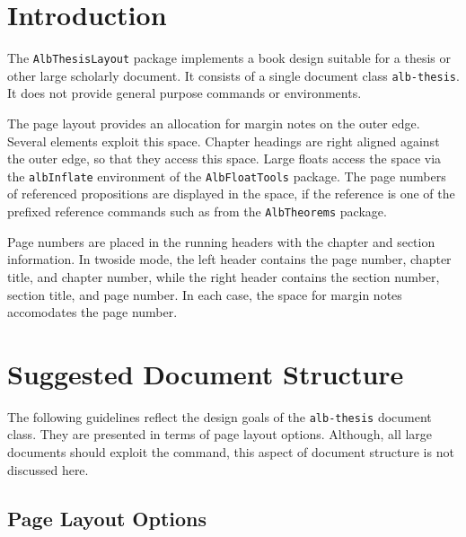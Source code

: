 \documentclass[11pt,a4paper,oneside,titlepage]{alb-corp}
\begin{document}

\section{Introduction}
\label{sec:alb-thesis-layout-documentation:intr}

The \texttt{AlbThesisLayout} package implements a book design suitable
for a thesis or other large scholarly document.  It consists of a single
document class \texttt{alb-thesis}.  It does not provide general purpose
commands or environments.

The page layout provides an allocation for margin notes on the outer
edge.  Several elements exploit this space.  Chapter headings are right
aligned against the outer edge, so that they access this space.  Large
floats access the space via the \texttt{albInflate} environment of the
\texttt{AlbFloatTools} package.  The page numbers of referenced
propositions are displayed in the space, if the reference is one of the
prefixed reference commands such as  from the
\texttt{AlbTheorems} package.

Page numbers are placed in the running headers with the chapter and
section information.  In twoside mode, the left header contains the page
number, chapter title, and chapter number, while the right header
contains the section number, section title, and page number.  In each
case, the space for margin notes accomodates the page number.




\section{Suggested Document Structure}
\label{sec:alb-thesis-layout-documentation:sugg-docum-struct}

The following guidelines reflect the design goals of the
\texttt{alb-thesis} document class.  They are presented in terms of page
layout options.  Although, all large documents should exploit the
 command, this aspect of document structure is not
discussed here.



\subsection{Page Layout Options}
\label{sec:alb-thesis-layout-documentation:page-layout-opti}
\end{document}
